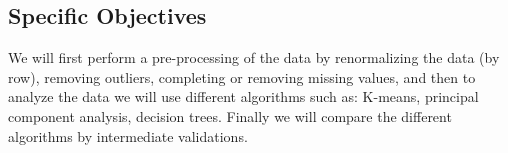 \documentclass[12pt]{article}
\begin{document}
\subsection{Specific Objectives}
We will first perform a pre-processing of the data by renormalizing the data (by row), removing outliers, completing or removing missing values, and then to analyze the data we will use different algorithms such as: K-means, principal component analysis, decision trees. Finally we will compare the different algorithms by intermediate validations. 
\end{document}
